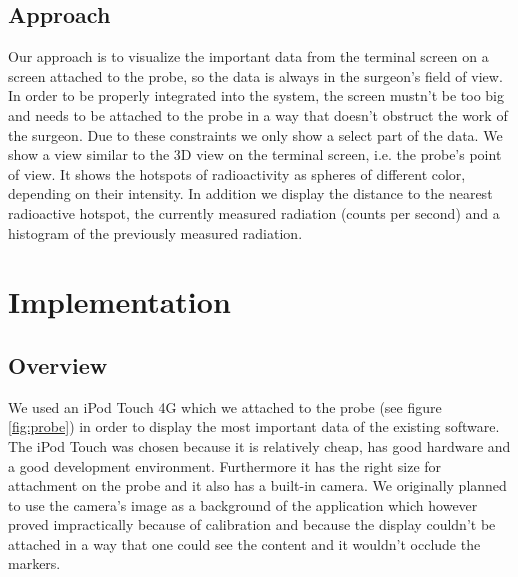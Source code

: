 \documentclass{scrartcl}
\newcommand{\red}[1]{{\color{red} #1}}
\newcommand{\refFigure}[1]{figure \ref{fig:#1}}
\begin{document}
\subsection{Approach}
Our approach is to visualize the important data from the terminal screen on a screen attached to the probe, so the data is always in the surgeon's field of view. In order to be properly integrated into the system, the screen mustn't be too big and needs to be attached to the probe in a way that doesn't obstruct the work of the surgeon. Due to these constraints we only show a select part of the data. We show a view similar to the 3D view on the terminal screen, i.e. the probe's point of view. It shows the hotspots of radioactivity as spheres of different color, depending on their intensity. In addition we display the distance to the nearest radioactive hotspot, the currently measured radiation (counts per second) and a histogram of the previously measured radiation.



\section{Implementation}

\subsection{Overview}
We used an iPod Touch 4G which we attached to the probe (see \refFigure{probe}) in order to display the most important data of the existing software.
The iPod Touch was chosen because it is relatively cheap, has good hardware and a good development environment. Furthermore it has the right size for attachment on the probe and it also has a built-in camera. We originally planned to use the camera's image as a background of the application which however proved impractically because of calibration and because the display couldn't be attached in a way that one could see the content and it wouldn't occlude the markers.
\end{document}
